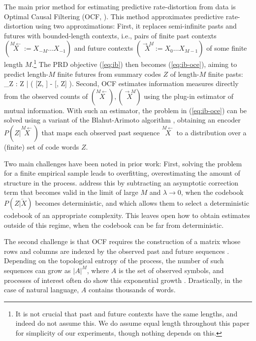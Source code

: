 \documentclass[entropy,article,submit,moreauthors,pdftex,10pt,a4paper]{Definitions/mdpi}
\newif \ifcomment
\newcommand\rljf[1]{\ifcomment{{\color{blue}(#1)}}\else{}\fi}
\newcommand{\past}{\overleftarrow{X}}
\newcommand{\finitefuture}{\stackrel{\rightarrow \scriptscriptstyle{M}}{X}}
\newcommand{\finitepast}{\stackrel{\scriptscriptstyle{M}\leftarrow}{X}}%
\let\oldequation\equation
\let\oldendequation\endequation
\renewenvironment{equation}
  {\linenomathNonumbers\oldequation}
  {\oldendequation\endlinenomath}
\begin{document}
The main prior method for estimating predictive rate-distortion from data is Optimal Causal Filtering (OCF, \citet{still-optimal-2010}).
This method approximates predictive rate-distortion using two approximations:
First, it replaces semi-infinite pasts and futures with bounded-length contexts, i.e., pairs of finite past contexts $(\finitepast := X_{-M}\dots X_{-1})$ and future contexts $(\finitefuture := X_{0}\dots X_{M-1})$ of some finite length $M$.\footnote{It is not crucial that past and future contexts have the same lengths, and indeed \citet{still-optimal-2010} do not assume this. We do assume equal length throughout this paper for simplicity of our experiments, though nothing depends on this.}
The PRD objective (\ref{eq:ib}) then becomes (\ref{eq:ib-oce}), aiming to predict length-$M$ finite futures from summary codes $Z$ of length-$M$ finite pasts:
\begin{equation}\label{eq:ib-oce}
	\max_{Z : Z \bot \finitefuture | \finitepast} \left( [Z, \finitefuture] - \lambda \cdot {}[\finitepast, Z] \right).
\end{equation}
Second, OCF estimates information measures directly from the observed counts of $(\finitepast), (\finitefuture)$ using the plug-in estimator of mutual information. %
With such an estimator, the problem in (\ref{eq:ib-oce}) can be solved using a variant of the Blahut-Arimoto algorithm \citep{tishby-information-1999}, obtaining an encoder $P(Z|\finitepast)$ that maps each observed past sequence $\finitepast$ to a distribution over a (finite) set of code words $Z$.

Two main challenges have been noted in prior work:
First, solving the problem for a finite empirical sample leads to overfitting, overestimating the amount of structure in the process.
\citet{still-optimal-2010} address this by subtracting an asymptotic correction term that becomes valid in the limit of large $M$ and $\lambda \rightarrow 0$, when the codebook $P(Z|\past)$ becomes deterministic, and which allows them to select a deterministic codebook of an appropriate complexity.
This leaves open how to obtain estimates outside of this regime, when the codebook can be far from deterministic.

The second challenge is that OCF requires the construction of a matrix whose rows and columns are indexed by the observed past and future sequences \citep{marzen-predictive-2016}.
Depending on the topological entropy of the process, the number of such sequences can grow as $|A|^M$, where $A$ is the set of observed symbols, and processes of interest often do show this exponential growth \citep{marzen-predictive-2016}.
Drastically, in the case of natural language, $A$ contains thousands of words.
\end{document}
